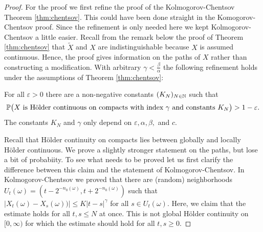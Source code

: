 \begin{proof}[Proof]
	For the proof we first refine the proof of the Kolmogorov-Chentsov Theorem \ref{thm:chentsov}. This could have been done straight in the Komogorov-Chentsov proof. Since the refinement is only needed here we kept Kolmogorov-Chentsov a little easier. Recall from the remark below the proof of Theorem \ref{thm:chentsov} that $\tilde X$ and $X$ are indistinguishable because $X$ is assumed continuous. Hence, the proof gives information on the paths of $X$ rather than constructing a modification. With arbitrary $\gamma<\frac{\beta}{\alpha}$ the following refinement holds under the assumptions of Theorem \ref{thm:chentsov}:
	\begin{lstep}
		For all $\varepsilon>0$ there are a non-negative constants $(K_N)_{N\in \N}$ such that
		\begin{align*}
			\P\big(\text{$X$ is H\"older continuous on compacts with index $\gamma$ and constants $K_N$}\big)>1-\varepsilon.
		\end{align*}
		The constants $K_N$ and $\gamma$ only depend on $\varepsilon, \alpha, \beta, $ and $c$.
	\end{lstep}
	Recall that H\"older continuity on compacts lies between globally and locally H\"older continuous. We prove a slightly stronger statement on the paths, but lose a bit of probabiity. To see what needs to be proved let us first clarify the difference between this claim and the statement of Kolmogorov-Chentsov. In Kolmogorov-Chentsov we proved that there are (random) neighborhoods $U_t(\omega)=(t-2^{-n_0(\omega)}, t+2^{-n_0(\omega)})$ such that $|X_t(\omega)-X_s(\omega))|\leq K|t-s|^\gamma$ for all $s\in U_t(\omega)$. Here, we claim that the estimate holds for all $t,s\leq N$ at once. This is not global H\"older continuity on $[0,\infty)$ for which the estimate should hold for all $t,s\geq 0$.\smallskip


\end{proof}
